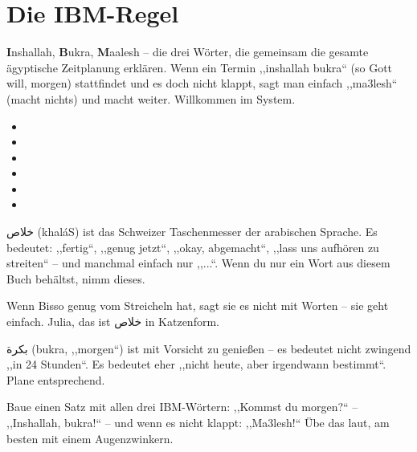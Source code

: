 
\chapter{Die IBM-Regel}

\begin{ibmbox}
\textbf{I}nshallah, \textbf{B}ukra, \textbf{M}aalesh -- die drei Wörter,
die gemeinsam die gesamte ägyptische Zeitplanung erklären. Wenn ein Termin
,,inshallah bukra`` (so Gott will, morgen) stattfindet und es doch nicht
klappt, sagt man einfach ,,ma3lesh`` (macht nichts) und macht weiter.
Willkommen im System.
\end{ibmbox}

\begin{itemize}[leftmargin=*]
\item {}
\item {}
\item {}
\item {}
\item {}
\item {}
\end{itemize}

\begin{lachbox}
\textarabic{خلاص} (khal\'aS) ist das Schweizer Taschenmesser der
arabischen Sprache. Es bedeutet: ,,fertig``, ,,genug jetzt``, ,,okay,
abgemacht``, ,,lass uns aufhören zu streiten`` -- und manchmal einfach nur
,,...``. Wenn du nur ein Wort aus diesem Buch behältst, nimm dieses.
\end{lachbox}

\begin{bissobox}
Wenn Bisso genug vom Streicheln hat, sagt sie es nicht mit Worten -- sie
geht einfach. Julia, das ist \textarabic{خلاص} in Katzenform.
\end{bissobox}

\begin{tippbox}
\textarabic{بكرة} (bukra, ,,morgen``) ist mit Vorsicht zu genießen -- es
bedeutet nicht zwingend ,,in 24 Stunden``. Es bedeutet eher ,,nicht heute,
aber irgendwann bestimmt``. Plane entsprechend.
\end{tippbox}

\begin{checkpointbox}
Baue einen Satz mit allen drei IBM-Wörtern: ,,Kommst du morgen?`` --
,,Inshallah, bukra!`` -- und wenn es nicht klappt: ,,Ma3lesh!`` Übe das
laut, am besten mit einem Augenzwinkern.
\end{checkpointbox}
